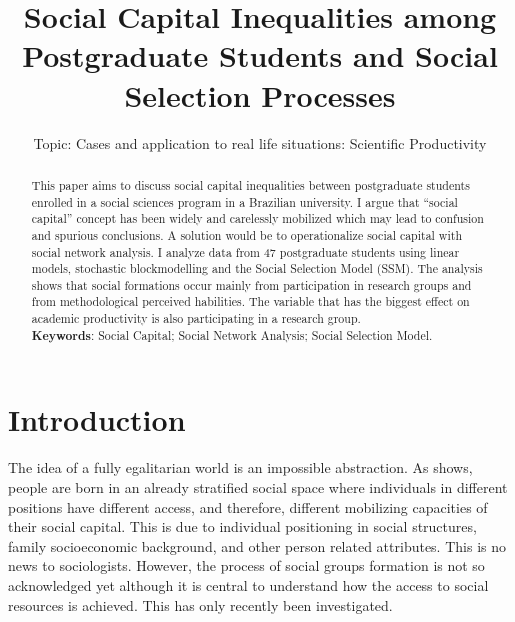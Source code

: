 \documentclass[12pt, english]{article}
\title{Social Capital Inequalities among Postgraduate Students and Social Selection Processes}
\author{Topic: Cases and application to real life situations: Scientific Productivity\inst{1}}
\begin{document}
 

\maketitle

\begin{abstract}
  This paper aims to discuss social capital inequalities between postgraduate students enrolled in a social sciences program in a Brazilian university. I argue that ``social capital'' concept has been widely and carelessly mobilized which may lead to confusion and spurious conclusions. A solution would be to operationalize social capital with social network analysis. I analyze data from 47 postgraduate students using linear models, stochastic blockmodelling and the Social Selection Model (SSM). The analysis shows that social formations occur mainly from participation in research groups and from methodological perceived habilities. The variable that has the biggest effect on academic productivity is also participating in a research group.
  \\
  \textbf{Keywords}: Social Capital; Social Network Analysis; Social Selection Model.
\end{abstract}
     


\section{Introduction}

The idea of a fully egalitarian world is an impossible abstraction. As \cite{lin1999building} shows, people are born in an already stratified social space where individuals in different positions have different access, and therefore, different mobilizing capacities of their social capital. This is due to individual positioning in social structures, family socioeconomic background, and other person related attributes. This is no news to sociologists. However, the process of social groups formation is not so acknowledged yet although it is central to understand how the access to social resources is achieved. This has only recently been investigated.
\end{document}
